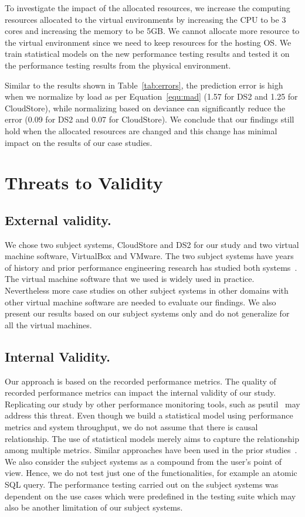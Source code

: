 \documentclass[smallextended]{svjour3}       %
\begin{document}
To investigate the impact of the allocated resources, we increase the computing resources allocated to the virtual environments by increasing the CPU to be 3 cores and increasing the memory to be 5GB. We cannot allocate more resource to the virtual environment since we need to keep resources for the hosting OS. We train statistical models on the new performance testing results and tested it on the performance testing results from the physical environment. 

Similar to the results shown in Table~\ref{tab:errors}, the prediction error is high when we normalize by load as per Equation~\ref{equ:mad} (1.57 for DS2 and 1.25 for CloudStore), while normalizing based on deviance can significantly reduce the error (0.09 for DS2 and 0.07 for CloudStore). We conclude that our findings still hold when the allocated resources are changed and this change has minimal impact on the results of our case studies.


	
\section{Threats to Validity}
\label{sec:threats}


\subsection{External validity.}
We chose two subject systems, CloudStore and DS2 for our study and two virtual machine software, VirtualBox and VMware. The two subject systems have years of history and prior performance engineering research has studied both systems~\cite{jackicsm2009,Nguyen:2012:ADP:2188286.2188344,tarekmsr16}. The virtual machine software that we used is widely used in practice. Nevertheless more case studies on other subject systems in other domains with other virtual machine software are needed to evaluate our findings. We also present our results based on our subject systems only and do not generalize for all the virtual machines.

\subsection{Internal Validity.}
Our approach is based on the recorded performance metrics. The quality of recorded performance metrics can impact the internal validity of our study. Replicating our study by other performance monitoring tools, such as psutil~\cite{psutil} may address this threat. Even though we build a statistical model using performance metrics and system throughput, we do not assume that there is causal relationship. The use of statistical models merely aims to capture the relationship among multiple metrics. Similar approaches have been used in the prior studies~\cite{Cohen:2005:CIC:1095810.1095821, Shang:2015:ADP:2668930.2688052, xiong2013vperfguard}. We also consider the subject systems as a compound from the user's point of view. Hence, we do not test just one of the functionalities, for example an atomic SQL query. The performance testing carried out on the subject systems was dependent on the use cases which were predefined in the testing suite which may also be another limitation of our subject systems.
\end{document}

